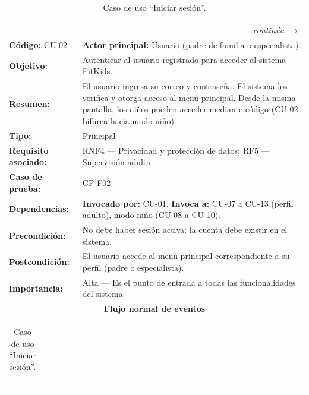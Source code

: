 				\begingroup
					\setlength{\LTpre}{6pt}\setlength{\LTpost}{6pt}
					\renewcommand{\arraystretch}{1.20}
					\footnotesize
					\begin{longtable}{p{4cm}p{10.4cm}}
						\caption{Caso de uso ``Iniciar sesión''.}\label{tab:cu02}\\
						\hline
						\rowcolor{headblue}\multicolumn{2}{c}{\textbf{\color{white}Caso de uso ``Iniciar sesión''}}\\\hline
						\endfirsthead
						\hline\rowcolor{headblue}\multicolumn{2}{c}{\textbf{\color{white}Caso de uso ``Iniciar sesión'' (continuación)}}\\\hline
						\endhead
						\hline\multicolumn{2}{r}{\footnotesize\itshape continúa $\rightarrow$}\\\endfoot
						\hline\endlastfoot
						\textbf{Código:} CU-02 & \textbf{Actor principal:} Usuario (padre de familia o especialista)\\
						\textbf{Objetivo:} & Autenticar al usuario registrado para acceder al sistema FitKids.\\
						\textbf{Resumen:} & El usuario ingresa su correo y contraseña. El sistema los verifica y otorga acceso al menú principal. Desde la misma pantalla, los niños pueden acceder mediante código (CU-02 bifurca hacia modo niño).\\
						\textbf{Tipo:} & Principal\\
						\textbf{Requisito asociado:} & RNF4 --- Privacidad y protección de datos; RF5 --- Supervisión adulta\\
						\textbf{Caso de prueba:} & CP-F02\\
						\textbf{Dependencias:} & \textbf{Invocado por:} CU-01. \textbf{Invoca a:} CU-07 a CU-13 (perfil adulto), modo niño (CU-08 a CU-10).\\
						\textbf{Precondición:} & No debe haber sesión activa; la cuenta debe existir en el sistema.\\
						\textbf{Postcondición:} & El usuario accede al menú principal correspondiente a su perfil (padre o especialista).\\
						\textbf{Importancia:} & Alta --- Es el punto de entrada a todas las funcionalidades del sistema.\\\hline
						\multicolumn{2}{c}{\cellcolor{grpgray}\textbf{Flujo normal de eventos}}\\\hline
						\multicolumn{2}{p{14.4cm}}{%
							\begin{tabular}{p{7.0cm}p{7.0cm}}

\end{tabular}}
\end{longtable}
